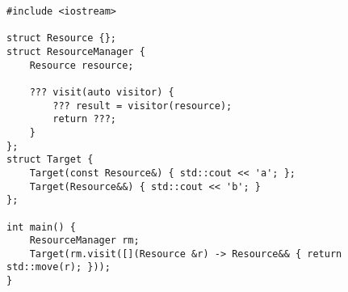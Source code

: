 \begin{lstlisting}[title=\href{https://godbolt.org/z/acbQ2Z}{\texttt{godbolt.org/z/acbQ2Z}}]
#include <iostream>

struct Resource {};
struct ResourceManager {
    Resource resource;

    ??? visit(auto visitor) {
        ??? result = visitor(resource);
        return ???;
    }
};
struct Target {
    Target(const Resource&) { std::cout << 'a'; };
    Target(Resource&&) { std::cout << 'b'; }
};

int main() {
    ResourceManager rm;
    Target(rm.visit([](Resource &r) -> Resource&& { return std::move(r); }));
}
\end{lstlisting}
